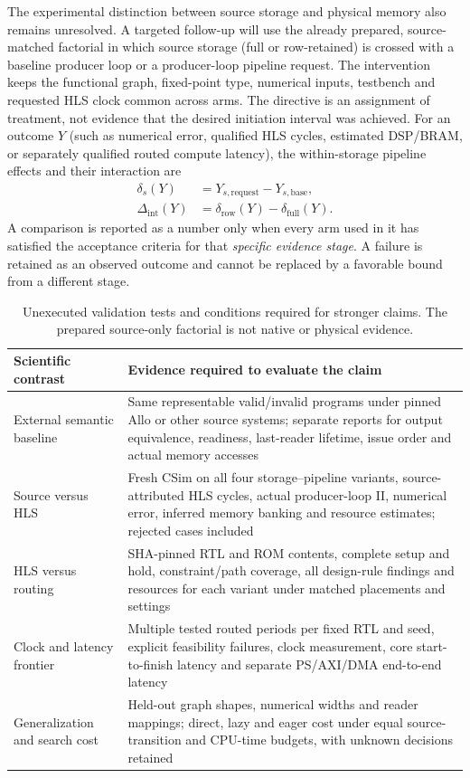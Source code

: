 \documentclass{article}
\begin{document}
The experimental distinction between source storage and physical memory also remains unresolved. A targeted follow-up will use the already prepared, source-matched factorial in which source storage (full or row-retained) is crossed with a baseline producer loop or a producer-loop pipeline request. The intervention keeps the functional graph, fixed-point type, numerical inputs, testbench and requested HLS clock common across arms. The directive is an assignment of treatment, not evidence that the desired initiation interval was achieved. For an outcome $Y$ (such as numerical error, qualified HLS cycles, estimated DSP/BRAM, or separately qualified routed compute latency), the within-storage pipeline effects and their interaction are
\begin{align}
\delta_s(Y)&=Y_{s,\mathrm{request}}-Y_{s,\mathrm{base}},\\
\Delta_{\mathrm{int}}(Y)&=\delta_{\mathrm{row}}(Y)-\delta_{\mathrm{full}}(Y).
\label{eq:factorial-interaction}
\end{align}
A comparison is reported as a number only when every arm used in it has satisfied the acceptance criteria for that \emph{specific evidence stage}. A failure is retained as an observed outcome and cannot be replaced by a favorable bound from a different stage.

\begin{table}[t]
\centering
\caption{Unexecuted validation tests and conditions required for stronger claims. The prepared source-only factorial is not native or physical evidence.}
\label{tab:future-tests}
\small
\setlength{\tabcolsep}{4pt}
\begin{tabularx}{\linewidth}{@{}>{\raggedright\arraybackslash}p{3.2cm}X@{}}
\toprule
Scientific contrast & Evidence required to evaluate the claim \\
\midrule
External semantic baseline & Same representable valid/invalid programs under pinned Allo or other source systems; separate reports for output equivalence, readiness, last-reader lifetime, issue order and actual memory accesses \\
Source versus HLS & Fresh CSim on all four storage--pipeline variants, source-attributed HLS cycles, actual producer-loop II, numerical error, inferred memory banking and resource estimates; rejected cases included \\
HLS versus routing & SHA-pinned RTL and ROM contents, complete setup and hold, constraint/path coverage, all design-rule findings and resources for each variant under matched placements and settings \\
Clock and latency frontier & Multiple tested routed periods per fixed RTL and seed, explicit feasibility failures, clock measurement, core start-to-finish latency and separate PS/AXI/DMA end-to-end latency \\
Generalization and search cost & Held-out graph shapes, numerical widths and reader mappings; direct, lazy and eager cost under equal source-transition and CPU-time budgets, with unknown decisions retained \\
\bottomrule
\end{tabularx}
\end{table}
\end{document}
